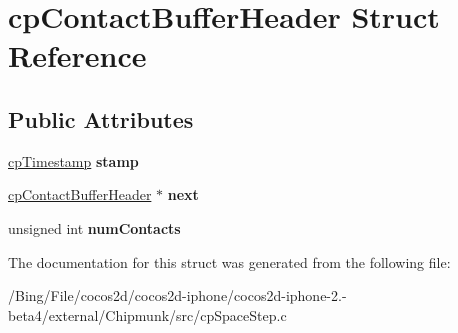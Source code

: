 \hypertarget{structcp_contact_buffer_header}{\section{cp\-Contact\-Buffer\-Header Struct Reference}
\label{structcp_contact_buffer_header}
}
\subsection*{Public Attributes}
\begin{DoxyCompactItemize}
\item 
\hypertarget{structcp_contact_buffer_header_a7319b6d338ded873cbbfc3fe97fbd72d}{\hyperlink{group__basic_types_gaa24652c104082d0725066ea5ac7dc83f}{cp\-Timestamp} {\bfseries stamp}}\label{structcp_contact_buffer_header_a7319b6d338ded873cbbfc3fe97fbd72d}

\item 
\hypertarget{structcp_contact_buffer_header_a50e887f9eea22825bbdcacf4c8bed480}{\hyperlink{structcp_contact_buffer_header}{cp\-Contact\-Buffer\-Header} $\ast$ {\bfseries next}}\label{structcp_contact_buffer_header_a50e887f9eea22825bbdcacf4c8bed480}

\item 
\hypertarget{structcp_contact_buffer_header_aac56f20a497a72693516e31543f59fbf}{unsigned int {\bfseries num\-Contacts}}\label{structcp_contact_buffer_header_aac56f20a497a72693516e31543f59fbf}

\end{DoxyCompactItemize}


The documentation for this struct was generated from the following file\-:\begin{DoxyCompactItemize}
\item 
/\-Bing/\-File/cocos2d/cocos2d-\/iphone/cocos2d-\/iphone-\/2.-\/beta4/external/\-Chipmunk/src/cp\-Space\-Step.\-c\end{DoxyCompactItemize}
